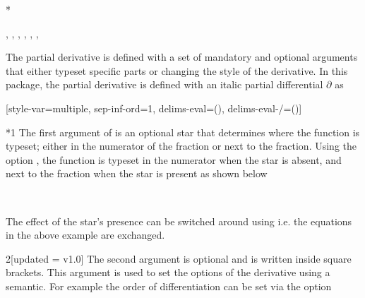 \begin{function}*{\pdv}
	\begin{syntax}
		\sarg, , , \targ{/}, \targ{!}, , 
	\end{syntax}
	The partial derivative  is defined with a set of mandatory and optional arguments that either typeset specific parts or changing the style of the derivative. In this package, the partial derivative is defined with an italic partial differential $\partial$ as
	
	\begin{definition}
		\DeclareDerivative{\pdv}{\partial}[style-var=multiple, sep-inf-ord=1,
		delims-eval=(), delims-eval-/=()]
	\end{definition}
	
	\begin{argument}*{1}
		The first argument of  is an optional star that determines where the function is typeset; either in the numerator of the fraction or next to the fraction. Using the option , the function is typeset in the numerator when the star is absent, and next to the fraction when the star is present as shown below
		
		\begin{example}
			 \\
		\end{example}
		
		\noindent The effect of the star's presence can be switched around using  i.e. the equations in the above example are exchanged.
	\end{argument}
	
	\begin{argument}{2}[updated = v1.0]
		The second argument is optional and is written inside square brackets. This argument is used to set the options of the derivative using a  semantic. For example the order of differentiation can be set via the  option
		
		\begin{example}
			\pdv[order={2,3}]{f}{x,y,z} \\
			\pdv[order={\beta,a,n+2a}]{f}{x,y,z} \\
			\pdv[order={2,n^2,n^2-1}]{f}{x,y,z} \\
			\pdv[order={3/2-n/3,n/2,1/3}]{f}{x,y,z}
		\end{example}
		

\end{argument}
\end{function}
